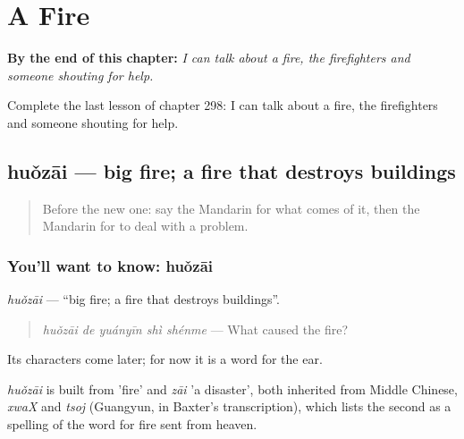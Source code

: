 
\chapter{A Fire}
\label{ch:zh-a-fire}

\begin{chapteropening}
\textbf{By the end of this chapter:} \emph{I can talk about a fire, the firefighters and someone shouting for help.}

Complete the last lesson of chapter 298: I can talk about a fire, the firefighters and someone shouting for help.
\end{chapteropening}

\section[huǒzāi]{huǒzāi — big fire; a fire that destroys buildings}

\label{lesson:ZH-C298-huozai}



\begin{quote}
Before the new one: say the Mandarin for what comes of it, then the Mandarin for to deal with a problem.
\end{quote}

\subsection*{You'll want to know: huǒzāi}
\emph{huǒzāi} — \textquotedblleft{}big fire; a fire that destroys buildings\textquotedblright{}.

\begin{quote}
\emph{huǒzāi de yuányīn shì shénme} — What caused the fire?
\end{quote}

Its characters come later; for now it is a word for the ear.

\begin{cousinweb}
\emph{huǒzāi} is built from  'fire' and \emph{zāi} 'a disaster', both inherited from Middle Chinese, \emph{xwaX} and \emph{tsoj} (Guangyun, in Baxter's transcription), which lists the second as a spelling of the word for fire sent from heaven.
\end{cousinweb}

